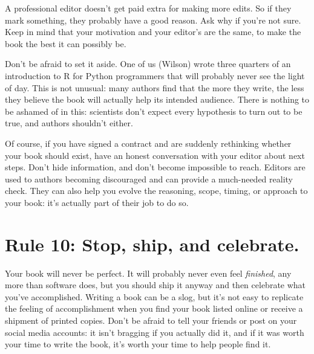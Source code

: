 \documentclass[10pt,letterpaper]{article}
\begin{document}
A professional editor doesn't get paid extra for making more edits. So
if they mark something, they probably have a good reason. Ask why if
you're not sure. Keep in mind that your motivation and your editor's are
the same, to make the book the best it can possibly be.

Don't be afraid to set it aside. One of us (Wilson) wrote three quarters
of an introduction to R for Python programmers that will probably never
see the light of day. This is not unusual: many authors find that the
more they write, the less they believe the book will actually help its
intended audience. There is nothing to be ashamed of in this: scientists
don't expect every hypothesis to turn out to be true, and authors
shouldn't either.

Of course, if you have signed a contract and are suddenly rethinking
whether your book should exist, have an honest conversation with your
editor about next steps. Don't hide information, and don't become
impossible to reach. Editors are used to authors becoming discouraged
and can provide a much-needed reality check. They can also help you
evolve the reasoning, scope, timing, or approach to your book: it's
actually part of their job to do so.

\section*{Rule 10: Stop, ship, and celebrate.}

Your book will never be perfect. It will probably never even feel
\emph{finished}, any more than software does, but you should ship it
anyway and then celebrate what you've accomplished. Writing a book can
be a slog, but it's not easy to replicate the feeling of accomplishment
when you find your book listed online or receive a shipment of printed
copies. Don't be afraid to tell your friends or post on your social
media accounts: it isn't bragging if you actually did it, and if it was
worth your time to write the book, it's worth your time to help people
find it.



\end{document}
